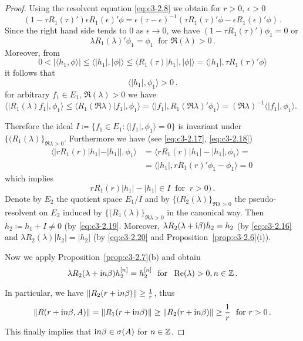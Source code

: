 \begin{proof}
Using the resolvent equation \eqref{eq:c3-2.8} we obtain for $r > 0$, $\epsilon > 0$
\[
(1 - \tau R_{1}(\tau)')\epsilon R_{1}(\epsilon)'\phi = \epsilon(\tau-\epsilon)^{-1}(\tau R_{1}(\tau)'\phi - \epsilon R_{1}(\epsilon)'\phi)\,.
\]
Since the right hand side tends to $0$ as $\epsilon \to 0$, we have $(1 - \tau R_{1}(\tau)')\phi_{1} = 0$ or
\begin{equation}\label{eq:c3-2.18}
\lambda R_{1}(\lambda)'\phi_{1} = \phi_{1} \ \text{ for } \Re(\lambda) > 0\,.
\end{equation} 
Moreover, from 
\[
0 < |\langle h_{1},\phi \rangle| \leq \langle |h_{1}|,|\phi| \rangle \leq \langle R_{1}(\tau)|h_{1}|,|\phi| \rangle = \langle |h_{1}|,\tau R_{1}(\tau)'\phi \rangle 
\]
it follows that
\begin{equation}\label{eq:c3-2.19}
		\langle |h_{1}|,\phi_{1} \rangle > 0\,.
\end{equation}
for arbitrary $f_{1} \in E_{1}$, $\Re(\lambda) > 0$ we have $\langle |R_{1}(\lambda)f_{1}|,\phi_{1} \rangle \leq \langle R_{1}(\Re \lambda)|f_{1}|,\phi_{1} \rangle = \langle |f_{1}|,R_{1}(\Re \lambda)'\phi_{1} \rangle = (\Re \lambda)^{-1}\langle |f_{1}|,\phi_{1} \rangle$.

Therefore the ideal $I \coloneqq \{f_{1} \in E_{1} \colon \langle |f_{1}|,\phi_{1} \rangle = 0\}$ is invariant under $\{(R_{1}(\lambda)\}_{\Re \lambda>0}$.
Furthermore we have (see \eqref{eq:c3-2.17}, \eqref{eq:c3-2.18}) 
\begin{align*}
	\langle |rR_{1}(r)|h_{1}| - |h_{1}||,\phi_{1} \rangle &= \langle rR_{1}(r)|h_{1}| - |h_{1}|,\phi_{1} \rangle = \\
	& = \langle |h_{1}|,rR_{1}(r)'\phi_{1} - \phi_{1} \rangle = 0\ 
\end{align*}	
which implies
\begin{equation}\label{eq:c3-2.20}
rR_{1}(r)|h_{1}| - |h_{1}| \in I \ \text{ for } \ r > 0)\,.
\end{equation}
Denote by $E_{2}$ the quotient space $E_{1}/I$ and by $\{(R_{2}(\lambda)\}_{\Re \lambda>0}$ the pseudo-resolvent on $E_{2}$ induced by $\{(R_{1}(\lambda)\}_{\Re \lambda>0}$ in the canonical way. 
Then $h_{2} \coloneqq h_{1} + I \neq 0$ (by \eqref{eq:c3-2.19}.
Moreover, $\lambda R_{2}(\lambda+\mathrm{i}\beta)h_{2} = h_{2}$ (by \eqref{eq:c3-2.16} and $\lambda R_{2}(\lambda)|h_{2}| = |h_{2}|$ (by \eqref{eq:c3-2.20} and Proposition~\ref{prop:c3-2.6}(i)).

Now we apply Proposition~\ref{prop:c3-2.7}(b) and obtain
\begin{equation}\label{eq:c3-2.21}
	\lambda R_{2}(\lambda+\mathrm{i} n\beta)h_{2}^{[n]} = h_{2}^{[n]}\ \text{ for } \ \mathop{}\!\mathrm{Re}(\lambda) > 0 , n \in \mathbb{Z}\,.
\end{equation}

In particular, we have $\|R_{2}(r+\mathrm{i} n\beta)\| \geq \frac{1}{r}$, thus 
\[
\|R(r+\mathrm{i} n\beta,A)\| = \|R_{1}(r+\mathrm{i} n\beta)\| \geq \|R_{2}(r+\mathrm{i} n\beta)\| \geq \frac{1}{r} \ \text{ for } r > 0\,.
\]
This finally implies that $ \mathrm{i} n\beta \in \sigma(A)$ for $n \in \mathbb{Z}$.
\end{proof}
